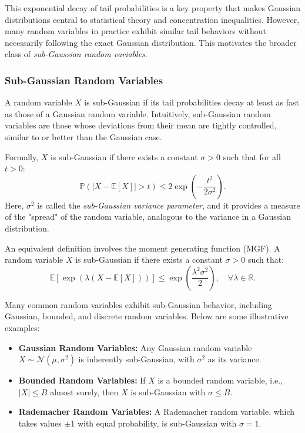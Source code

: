 This exponential decay of tail probabilities is a key property that makes Gaussian distributions central to statistical theory and concentration inequalities. However, many random variables in practice exhibit similar tail behaviors without necessarily following the exact Gaussian distribution. This motivates the broader class of \textit{sub-Gaussian random variables}.  

\subsubsection{Sub-Gaussian Random Variables}  
A random variable \( X \) is sub-Gaussian if its tail probabilities decay at least as fast as those of a Gaussian random variable. Intuitively, sub-Gaussian random variables are those whose deviations from their mean are tightly controlled, similar to or better than the Gaussian case.  

Formally, \( X \) is sub-Gaussian if there exists a constant \( \sigma > 0 \) such that for all \( t > 0 \):  
\[
\mathbb{P}(|X - \mathbb{E}[X]| > t) \leq 2 \exp\left(-\frac{t^2}{2\sigma^2}\right).
\]  
Here, \( \sigma^2 \) is called the \textit{sub-Gaussian variance parameter}, and it provides a measure of the "spread" of the random variable, analogous to the variance in a Gaussian distribution.  

An equivalent definition involves the moment generating function (MGF). A random variable \( X \) is sub-Gaussian if there exists a constant \( \sigma > 0 \) such that:  
\[
\mathbb{E}[\exp(\lambda(X - \mathbb{E}[X]))] \leq \exp\left(\frac{\lambda^2 \sigma^2}{2}\right), \quad \forall \lambda \in \mathbb{R}.
\]  

Many common random variables exhibit sub-Gaussian behavior, including Gaussian, bounded, and discrete random variables. Below are some illustrative examples:  
\begin{itemize}
    \item \textbf{Gaussian Random Variables:} Any Gaussian random variable \( X \sim \mathcal{N}(\mu, \sigma^2) \) is inherently sub-Gaussian, with \( \sigma^2 \) as its variance.  
    \item \textbf{Bounded Random Variables:} If \( X \) is a bounded random variable, i.e., \( |X| \leq B \) almost surely, then \( X \) is sub-Gaussian with \( \sigma \leq B \).  
    \item \textbf{Rademacher Random Variables:} A Rademacher random variable, which takes values \( \pm 1 \) with equal probability, is sub-Gaussian with \( \sigma = 1 \).  
\end{itemize}  

